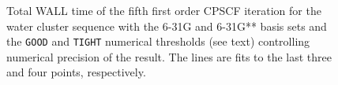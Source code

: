 \documentclass[twocolumn,showpacs,preprintnumbers,amsmath,amssymb]{revtex4}
\begin{document}
\begin{figure}[t]
  \caption{\protect
    Total WALL time of the fifth first order CPSCF iteration for
    the water cluster sequence with the 6-31G and 6-31G** 
    basis sets and the {\tt GOOD} and {\tt TIGHT} 
    numerical thresholds (see text) controlling numerical
    precision of the result. The lines are fits to the 
    last three and four points, respectively.
  }\label{Alpha_scaling}
\end{figure}
\end{document}
